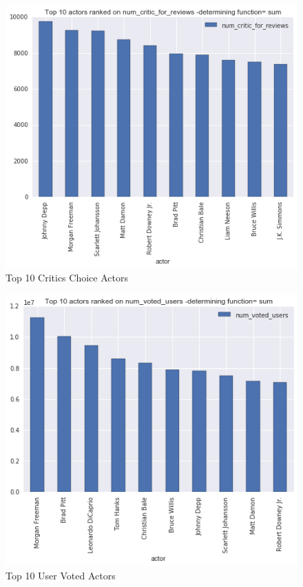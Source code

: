 \documentclass{article}%
\begin{document}
\begin{figure}
\centering
\includegraphics[width=1.0\columnwidth]{Fig/ttanc.png}
\caption{Top 10 Critics Choice Actors}
\label{fig:ttanc}
\end{figure}

\begin{figure}
\centering
\includegraphics[width=1.0\columnwidth]{Fig/Top10actorsbasedonnumvotedusers.png}
\caption{Top 10 User Voted Actors}
\label{fig:Top10actorsbasedonnumvotedusers}
\end{figure}
\end{document}
